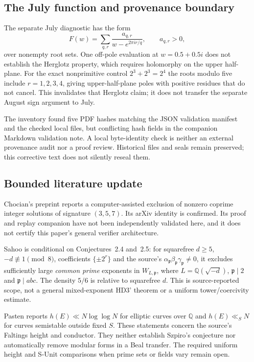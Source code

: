 \documentclass[11pt,a4paper]{article}
\begin{document}
\subsection{The July function and provenance boundary}
The separate July diagnostic has the form
\[
 F(w)=\sum_{q,r}\frac{a_{q,r}}{w-e^{2\pi i r/q}},
 \qquad a_{q,r}>0,
\]
over nonempty root sets. One off-pole evaluation at
$w=0.5+0.5i$ does not establish the Herglotz property, which requires
holomorphy on the upper half-plane.
For the exact nonprimitive control $2^3+2^3=2^4$ the roots modulo
five include $r=1,2,3,4$, giving upper-half-plane poles with positive
residues that do not cancel. This invalidates that Herglotz claim;
it does not transfer the separate August sign argument to July.

The inventory found five PDF hashes matching the JSON validation
manifest and the checked local files, but conflicting hash fields
in the companion Markdown validation note. A local byte-identity
check is neither an external provenance audit nor a proof review.
Historical files and seals remain preserved; this corrective text
does not silently reseal them.

\subsection{Bounded literature update}
Chocian's preprint \cite{Chocian2026} reports a computer-assisted
exclusion of nonzero coprime integer solutions of signature
$(3,5,7)$. Its arXiv identity is confirmed. Its proof and replay
companion have not been independently validated here, and it does
not certify this paper's general verifier architecture.

Sahoo \cite[Theorem~1.10, Proposition~1.12]{Sahoo2026} is conditional
on Conjectures~2.4 and~2.5: for squarefree $d\ge5$,
$-d\not\equiv1\pmod8$, coefficients $\{\pm2^r\}$ and the source's
$\alpha_{\mathfrak p}\beta_{\mathfrak p}\gamma_{\mathfrak p}\ne0$,
it excludes sufficiently large \emph{common prime} exponents in
$W_{L,\mathfrak p}$, where $L=\mathbb Q(\sqrt{-d})$,
$\mathfrak p\mid2$ and $\mathfrak p\mid abc$.
The density $5/6$ is relative to squarefree $d$.
This is source-reported scope, not a general mixed-exponent HD3'
theorem or a uniform tower/coercivity estimate.

Pasten \cite[Corollaries~1.2--1.3]{Pasten2026} reports
$h(E)\ll N\log\log N$ for elliptic curves over $\mathbb Q$ and
$h(E)\ll_S N$ for curves semistable outside fixed $S$.
These statements concern the source's Faltings height and conductor.
They neither establish Szpiro's conjecture nor automatically remove
modular forms in a Beal transfer. The required uniform height and
S-Unit comparisons when prime sets or fields vary remain open.
\end{document}
